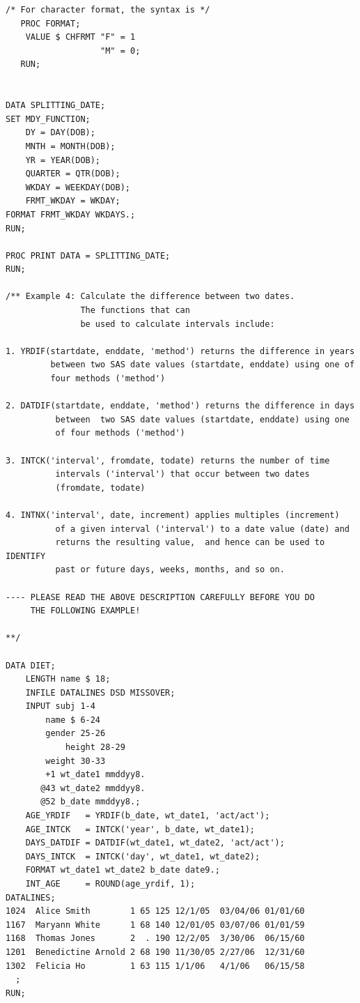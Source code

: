 \documentclass[
]{book}
\begin{document}
\begin{verbatim}
/* For character format, the syntax is */
   PROC FORMAT;
    VALUE $ CHFRMT "F" = 1
                   "M" = 0;
   RUN;


DATA SPLITTING_DATE;
SET MDY_FUNCTION;
    DY = DAY(DOB);
    MNTH = MONTH(DOB);
    YR = YEAR(DOB); 
    QUARTER = QTR(DOB);
    WKDAY = WEEKDAY(DOB);
    FRMT_WKDAY = WKDAY;
FORMAT FRMT_WKDAY WKDAYS.;
RUN;

PROC PRINT DATA = SPLITTING_DATE;
RUN;

/** Example 4: Calculate the difference between two dates. 
               The functions that can 
               be used to calculate intervals include:

1. YRDIF(startdate, enddate, 'method') returns the difference in years 
         between two SAS date values (startdate, enddate) using one of 
         four methods ('method')

2. DATDIF(startdate, enddate, 'method') returns the difference in days 
          between  two SAS date values (startdate, enddate) using one 
          of four methods ('method')

3. INTCK('interval', fromdate, todate) returns the number of time 
          intervals ('interval') that occur between two dates 
          (fromdate, todate)

4. INTNX('interval', date, increment) applies multiples (increment) 
          of a given interval ('interval') to a date value (date) and 
          returns the resulting value,  and hence can be used to IDENTIFY 
          past or future days, weeks, months, and so on.

---- PLEASE READ THE ABOVE DESCRIPTION CAREFULLY BEFORE YOU DO 
     THE FOLLOWING EXAMPLE!

**/

DATA DIET;
    LENGTH name $ 18;
    INFILE DATALINES DSD MISSOVER;
    INPUT subj 1-4 
        name $ 6-24
        gender 25-26
            height 28-29
        weight 30-33
        +1 wt_date1 mmddyy8. 
       @43 wt_date2 mmddyy8. 
       @52 b_date mmddyy8.;
    AGE_YRDIF   = YRDIF(b_date, wt_date1, 'act/act');
    AGE_INTCK   = INTCK('year', b_date, wt_date1);
    DAYS_DATDIF = DATDIF(wt_date1, wt_date2, 'act/act');
    DAYS_INTCK  = INTCK('day', wt_date1, wt_date2);
    FORMAT wt_date1 wt_date2 b_date date9.; 
    INT_AGE     = ROUND(age_yrdif, 1);
DATALINES;
1024  Alice Smith        1 65 125 12/1/05  03/04/06 01/01/60
1167  Maryann White      1 68 140 12/01/05 03/07/06 01/01/59
1168  Thomas Jones       2  . 190 12/2/05  3/30/06  06/15/60
1201  Benedictine Arnold 2 68 190 11/30/05 2/27/06  12/31/60
1302  Felicia Ho         1 63 115 1/1/06   4/1/06   06/15/58
  ;
RUN;


\end{verbatim}
\end{document}
